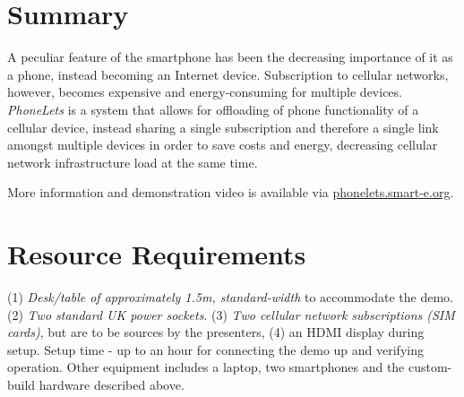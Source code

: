 \documentclass{sig-alternate-10pt}
\begin{document}
\section{Summary}

A peculiar feature of the smartphone has been the decreasing importance of it as a phone, instead becoming an Internet device. Subscription to cellular networks, however, becomes expensive and energy-consuming for multiple devices. \emph{PhoneLets} is a system that allows for offloading of phone functionality of a cellular device, instead sharing a single subscription and therefore a single link amongst multiple devices in order to save costs and energy, decreasing cellular network infrastructure load at the same time.

More information and demonstration video is available via \url{phonelets.smart-e.org}.


\section*{Resource Requirements}

(1) \emph{Desk/table of approximately 1.5m, standard-width} to accommodate the demo. (2) \emph{Two standard UK power sockets}. (3) \emph{Two cellular network subscriptions (SIM cards)}, but are to be sources by the presenters, (4) an HDMI display during setup. Setup time - up to an hour for connecting the demo up and verifying operation. Other equipment includes a laptop, two smartphones and the custom-build hardware described above.


{\footnotesize 


}

%
\end{document}
